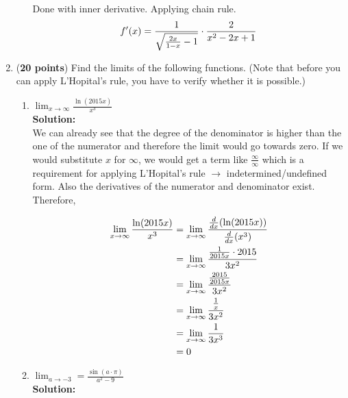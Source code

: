 \documentclass[a4paper]{article}
\begin{document}
\begin{enumerate}
\begin{enumerate}
Done with inner derivative. Applying chain rule.\\


\begin{align*}
	f'(x) = \frac{1}{\sqrt{\frac{2x}{1 - x} -1}} \cdot \frac{2}{x^2 - 2x + 1}\notag
\end{align*}


\end{enumerate}






\item (\textbf{20 points}) Find the limits of the following functions. (Note that before you can apply L'Hopital's rule, you have to verify whether it is possible.)


\begin{enumerate}
	\item $\lim_{x \to \infty} \frac{\ln(2015x)}{x^3}$\\
	\textbf{Solution:}\\
	
We can already see that the degree of the denominator is higher than the one of the numerator and therefore the limit would go towards zero. If we would substitute $x$ for $\infty$, we would get a term like $\frac{\infty}{\infty}$ which is a requirement for applying  L'Hopital's rule $\rightarrow$ indetermined/undefined form. Also the derivatives of the numerator and denominator exist.\\

Therefore,

\begin{align*}
	\lim_{x \to \infty} \frac{\ln(2015x)}{x^3} &= \lim_{x \to \infty} \frac{\frac{d}{dx}(\ln(2015x))}{\frac{d}{dx}(x^3)}\notag\\
	&= \lim_{x \to \infty} \frac{\frac{1}{2015x} \cdot 2015}{3x^2}\notag\\
	&= \lim_{x \to \infty} \frac{\frac{2015}{2015x}}{3x^2}\notag\\
	&= \lim_{x \to \infty} \frac{\frac{1}{x}}{3x^2}\notag\\
	&= \lim_{x \to \infty} \frac{1}{3x^3}\notag\\
	&= 0\notag
\end{align*} 	
	
	
	
	
	
	\item $\lim_{a \to -3} = \frac{\sin(a \cdot \pi)}{a^2 - 9}$\\
	\textbf{Solution:}\\
	

\end{enumerate}
\end{enumerate}
\end{document}
